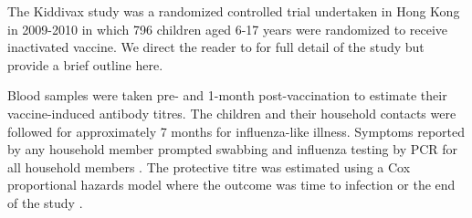 The Kiddivax study was a randomized controlled trial undertaken in Hong Kong in 2009-2010 in which 796 children aged 6-17 years were randomized to receive inactivated vaccine. We direct the reader to \citep{Cowling;2013} for full detail of the study but provide a brief outline here.

Blood samples were taken pre- and 1-month post-vaccination to estimate their vaccine-induced antibody titres.  The children and their household contacts were followed for approximately 7 months for influenza-like illness. Symptoms reported by any household member prompted swabbing and influenza testing by PCR for all household members \citep{Cowling;2013}. The protective titre was estimated using a Cox proportional hazards model where the outcome was time to infection or the end of the study \cite{Ng;2013}.
